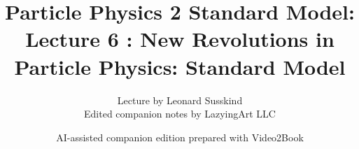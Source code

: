\documentclass[11pt,oneside]{book}
\begin{document}
\frontmatter
\title{Particle Physics 2 Standard Model: Lecture 6 : New Revolutions in Particle Physics: Standard Model}
\author{Lecture by Leonard Susskind\\Edited companion notes by LazyingArt LLC}
\date{AI-assisted companion edition prepared with Video2Book}
\maketitle
\clearpage
\mainmatter

\end{document}

